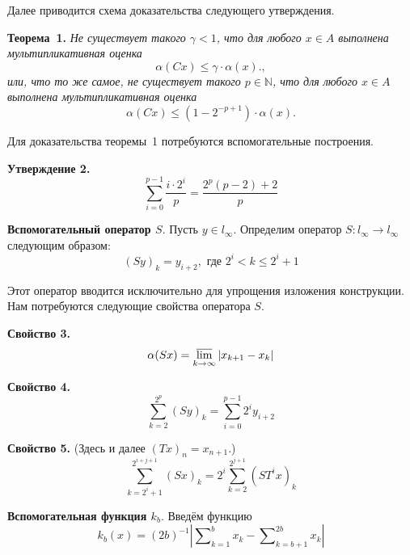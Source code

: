 \documentclass[a5paper,12pt,openbib]{report}
\begin{document}
Далее приводится схема доказательства следующего утверждения.


\textbf{Теорема~1.}
{\it
	Не существует такого $\gamma < 1$,
	что для любого $x\in A$ выполнена мультипликативная оценка
	$$
		\alpha(Cx) \leqslant \gamma \cdot \alpha(x).
	,
	$$
или, что то же самое, не существует такого $p\in \mathbb{N}$,
	что для любого $x\in A$ выполнена мультипликативная оценка
	$$
		\alpha(Cx) \leqslant (1-2^{-p+1})\cdot \alpha(x).
	$$
}

Для доказательства теоремы~1 потребуются вспомогательные построения.


\textbf{Утверждение 2.}
\begin{equation}\label{summa_drobey}
	\sum_{i=0}^{p-1} \frac{i \cdot 2^i}{p} = \frac{2^p(p-2) + 2}{p}
\end{equation}


\textbf{Вспомогательный оператор $S$}.
Пусть $y\in l_\infty$.
Определим оператор $S:l_\infty \to l_\infty$ следующим образом:
\begin{equation}\label{operator_S}
	(Sy)_k = y_{i+2}, \mbox{ где } 2^i < k \leq 2^i+1
\end{equation}

Этот оператор вводится исключительно для упрощения изложения конструкции.
Нам потребуются следующие свойства оператора $S$.

\textbf{Свойство 3.}
\begin{equation}\label{alpha_S}
	\alpha(Sx) = \varlimsup_{k\to\infty} |x_{k+1} - x_{k}|
\end{equation}

\textbf{Свойство 4.}
\begin{equation}\label{summa_S_less}
	\sum_{k=2}^{2^p} (Sy)_k =
	\sum_{i=0}^{p-1} 2^i y_{i+2}
\end{equation}


\textbf{Свойство 5.} (Здесь и далее $(Tx)_n = x_{n+1}$.)
\begin{equation}\label{summa_S}
	\sum_{k=2^i+1}^{2^{i+j+1}} (Sx)_k =
	2^i\sum_{k=2}^{2^{j+1}} (ST^ix)_k
\end{equation}

\textbf{Вспомогательная функция $k_b$}.
Введём функцию
\begin{equation}\label{def_k_b}
	k_b(x) = (2b)^{-1} \left|
		\sum\nolimits_{k=1}^{b}x_k - \sum\nolimits_{k=b+1}^{2b}x_k
	\right|
\end{equation}
\end{document}
